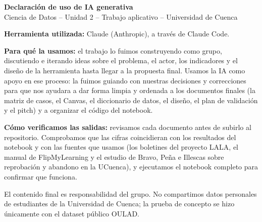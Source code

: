 \documentclass[11pt]{article}
\begin{document}
\begin{center}
{\Large\bfseries Declaración de uso de IA generativa}\\[2pt]
Ciencia de Datos -- Unidad 2 -- Trabajo aplicativo -- Universidad de Cuenca
\end{center}

\textbf{Herramienta utilizada:} Claude (Anthropic), a través de Claude Code.

\textbf{Para qué la usamos:} el trabajo lo fuimos construyendo como grupo, discutiendo e iterando ideas sobre el problema, el actor, los indicadores y el diseño de la herramienta hasta llegar a la propuesta final. Usamos la IA como apoyo en ese proceso: la fuimos guiando con nuestras decisiones y correcciones para que nos ayudara a dar forma limpia y ordenada a los documentos finales (la matriz de casos, el Canvas, el diccionario de datos, el diseño, el plan de validación y el pitch) y a organizar el código del notebook.

\textbf{Cómo verificamos las salidas:} revisamos cada documento antes de subirlo al repositorio. Comprobamos que las cifras coincidieran con los resultados del notebook y con las fuentes que usamos (los boletines del proyecto LALA, el manual de FlipMyLearning y el estudio de Bravo, Peña e Illescas sobre reprobación y abandono en la UCuenca), y ejecutamos el notebook completo para confirmar que funciona.

El contenido final es responsabilidad del grupo. No compartimos datos personales de estudiantes de la Universidad de Cuenca; la prueba de concepto se hizo únicamente con el dataset público OULAD.
\end{document}
